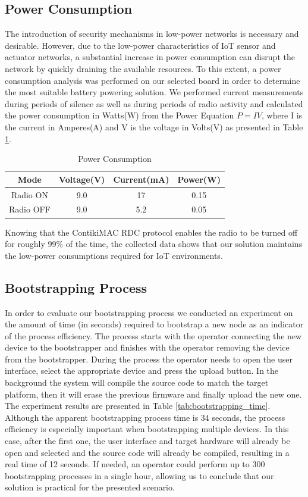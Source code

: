 \documentclass{sig-alternate-05-2015}
\begin{document}
\subsection{Power Consumption}
The introduction of security mechanisms in low-power networks is necessary and desirable. However, due to the low-power characteristics of \gls{IoT} sensor and actuator networks, a substantial increase in power consumption can disrupt the network by quickly draining the available resources. 
To this extent, a power consumption analysis was performed on our selected board in order to determine the most suitable battery powering solution. 
We performed current measurements during periods of silence as well as during periods of radio activity and calculated the power consumption in Watts(W) from the Power Equation $P = I  V$, where I is the current in Amperes(A) and V is the voltage in Volts(V) as presented in Table \ref{tab:power_consumptions}.

\begin{table}
\centering
\caption{Power Consumption}
\label{tab:power_consumptions}
\begin{tabular}{|c|c|c|c|} \hline
Mode&Voltage(V)&Current(mA)&Power(W)\\ \hline
Radio ON& 9.0& 17&0.15\\ \hline
Radio OFF& 9.0& 5.2&0.05\\ 
\hline\end{tabular}
\end{table}

Knowing that the ContikiMAC \gls{RDC} protocol enables the radio to be turned off for roughly 99\% of the time\cite{Dunkels2011}, the collected data shows that our solution maintains the low-power consumptions required for \gls{IoT} environments.

\subsection{Bootstrapping Process}
In order to evaluate our bootstrapping process we conducted an experiment on the amount of time (in seconds) required to bootstrap a new node as an indicator of the process efficiency. The process starts with the operator connecting the new device to the bootstrapper and finishes with the operator removing the device from the bootstrapper. During the process the operator needs to open the user interface, select the appropriate device and press the upload button. In the background the system will compile the source code to match the target platform, then it will erase the previous firmware and finally upload the new one. The experiment results are presented in Table \ref{tab:bootstrapping_time}. Although the apparent bootstrapping process time is 34 seconds, the process efficiency is especially important when bootstrapping multiple devices. In this case, after the first one, the user interface and target hardware will already be open and selected and the source code will already be compiled, resulting in a real time of 12 seconds. If needed, an operator could perform up to 300 bootstrapping processes in a single hour, allowing us to conclude that our solution is practical for the presented scenario.
\end{document}
